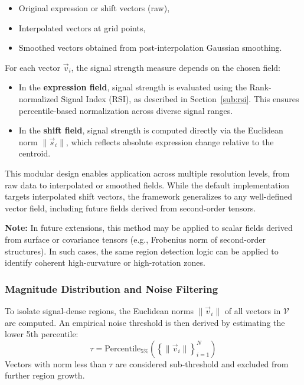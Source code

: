 \documentclass{article}
\begin{document}
\begin{itemize}
    \item Original expression or shift vectors (raw),
    \item Interpolated vectors at grid points,
    \item Smoothed vectors obtained from post-interpolation Gaussian smoothing.
\end{itemize}

For each vector \( \vec{v}_i \), the signal strength measure depends on the chosen field:
\begin{itemize}
    \item In the \textbf{expression field}, signal strength is evaluated using the Rank-normalized Signal Index (RSI), as described in Section~\ref{sub:rsi}. This ensures percentile-based normalization across diverse signal ranges.
    \item In the \textbf{shift field}, signal strength is computed directly via the Euclidean norm \( \| \vec{s}_i \| \), which reflects absolute expression change relative to the centroid.
\end{itemize}

This modular design enables application across multiple resolution levels, from raw data to interpolated or smoothed fields. While the default implementation targets interpolated shift vectors, the framework generalizes to any well-defined vector field, including future fields derived from second-order tensors.

\textbf{Note:} In future extensions, this method may be applied to scalar fields derived from surface or covariance tensors (e.g., Frobenius norm of second-order structures). In such cases, the same region detection logic can be applied to identify coherent high-curvature or high-rotation zones.

\subsubsection{Magnitude Distribution and Noise Filtering}

To isolate signal-dense regions, the Euclidean norms \( \| \vec{v}_i \| \) of all vectors in \( \mathcal{V} \) are computed. An empirical noise threshold is then derived by estimating the lower 5th percentile:
\[
\tau = \text{Percentile}_{5\%} \left( \left\{ \| \vec{v}_i \| \right\}_{i=1}^N \right)
\]
Vectors with norm less than \( \tau \) are considered sub-threshold and excluded from further region growth.
\end{document}
